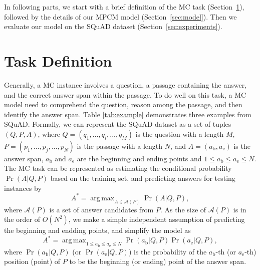 \documentclass[11pt,letterpaper]{article}
\DeclareMathOperator*{\argmax}{arg\,max}
\begin{document}
In following parts, we start with a brief definition of the MC task (Section~\ref{sec:definition}), 
followed by the details of our MPCM model (Section~\ref{sec:model}).
Then we evaluate our model on the SQuAD dataset (Section~\ref{sec:experiments}).


\section{Task Definition}
\label{sec:definition}

Generally, a MC instance involves a question, a passage containing the answer, and the correct answer span within the passage. 
To do well on this task, a MC model need to comprehend the question, reason among the passage, and then identify the answer span. 
Table \ref{tab:example} demonstrates three examples from SQuAD. 
Formally, we can represent the SQuAD dataset as a set of tuples $(Q, P, A)$, 
where $Q=(q_1, ..., q_i, ..., q_M)$ is the question with a length $M$, 
$P=(p_1, ..., p_j, ..., p_N)$ is the passage with a length $N$, 
and $A=(a_{\text{b}}, a_{\text{e}})$ is the answer span, 
$a_{\text{b}}$ and $a_{\text{e}}$ are the beginning and ending points and $1 \leq a_{\text{b}} \leq a_{\text{e}} \leq N$. 
The MC task can be represented as estimating the conditional probability $\Pr{(A|Q,P)}$ based on the training set, 
and predicting answers for testing instances by 
\begin{equation}
A^* = \argmax_{A \in \mathcal{A}(P)} \Pr(A|Q, P), 
\label{eq:predspan}
\end{equation}
where $\mathcal{A}(P)$ is a set of answer candidates from $P$. 
As the size of $\mathcal{A}(P)$ is in the order of $O(N^2)$, 
we make a simple independent assumption of predicting the beginning and endding points, 
and simplify the model as 
\begin{equation}
A^* = \argmax_{1 \leq a_{\text{b}} \leq a_{\text{e}} \leq N} \Pr(a_{\text{b}}|Q, P)\Pr(a_{\text{e}}|Q, P), 
\end{equation}
where $\Pr(a_{\text{b}}|Q, P)$ (or $\Pr(a_{\text{e}}|Q, P)$) 
is the probability of the $a_{\text{b}}$-th (or $a_{\text{e}}$-th) position (point) of $P$ 
to be the beginning (or ending) point of the answer span. 
\end{document}
